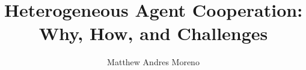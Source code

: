 \documentclass[12pt]{article}
\title{{\large Heterogeneous Agent Cooperation: Why, How, and Challenges}}
\author{Matthew Andres Moreno}
\theoremstyle{definition}
\begin{document}
\section*{\thetitle}





\end{document}
